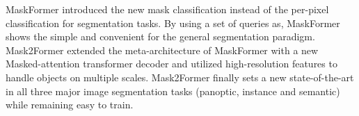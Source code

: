 \vspace{-2mm}
MaskFormer \cite{cheng_per-pixel_2021} introduced the new mask classification instead of the per-pixel classification for segmentation tasks. By using a set of queries as, MaskFormer shows the simple and convenient for the general segmentation paradigm.\\ Mask2Former \cite{cheng_masked-attention_2022} extended the meta-architecture of MaskFormer with a new Masked-attention transformer decoder and utilized high-resolution features to handle objects on multiple scales. Mask2Former finally sets a new state-of-the-art in all three major image segmentation tasks (panoptic, instance and semantic) while remaining easy to train. 


